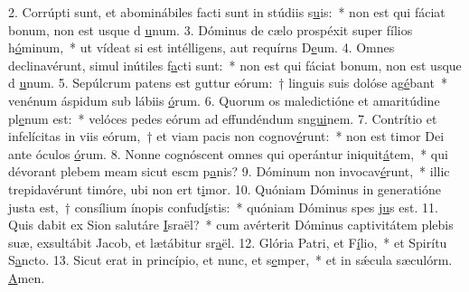 2. Corrúpti sunt, et abominábiles facti sunt in stúdiis s\uline{u}is:~* non est qui fáciat bonum, non est usque d \uline{u}num.
3. Dóminus de cælo prospéxit super fílios h\uline{ó}minum,~* ut vídeat si est intélligens, aut requírns D\uline{e}um.
4. Omnes declinavérunt, simul inútiles f\uline{a}cti sunt:~* non est qui fáciat bonum, non est usque d \uline{u}num.
5. Sepúlcrum patens est guttur eórum:~† linguis suis dolóse ag\uline{é}bant~* venénum áspidum sub lábiis \uline{ó}rum.
6. Quorum os maledictióne et amaritúdine pl\uline{e}num est:~* velóces pedes eórum ad effundéndum sn\uline{gui}nem.
7. Contrítio et infelícitas in viis eórum,~† et viam pacis non cognov\uline{é}runt:~* non est timor Dei ante óculos \uline{ó}rum.
8. Nonne cognóscent omnes qui operántur iniquit\uline{á}tem,~* qui dévorant plebem meam sicut escm p\uline{a}nis?
9. Dóminum non invocav\uline{é}runt,~* illic trepidavérunt timóre, ubi non ert t\uline{i}mor.
10. Quóniam Dóminus in generatióne justa est,~† consílium ínopis confud\uline{í}stis:~* quóniam Dóminus spes j\uline{u}s est.
11. Quis dabit ex Sion salutáre \uline{I}sraël?~* cum avérterit Dóminus captivitátem plebis suæ, exsultábit Jacob, et lætábitur sr\uline{a}ël.
12. Glória Patri, et F\uline{í}lio,~* et Spirítu S\uline{a}ncto.
13. Sicut erat in princípio, et nunc, et s\uline{e}mper,~* et in sǽcula sæculórm. \uline{A}men.
